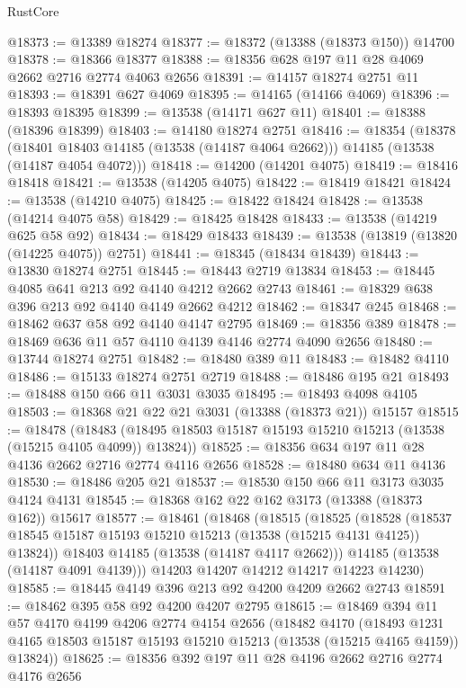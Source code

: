 \begin{lexlean}{RustCore}
\begin{coremodule}
@18373 := @13389 @18274
@18377 := @18372 (@13388 (@18373 @150)) @14700
@18378 := @18366 @18377
@18388 := @18356 @628 @197 @11 @28 @4069 @2662 @2716 @2774 @4063 @2656
@18391 := @14157 @18274 @2751 @11
@18393 := @18391 @627 @4069
@18395 := @14165 (@14166 @4069)
@18396 := @18393 @18395
@18399 := @13538 (@14171 @627 @11)
@18401 := @18388 (@18396 @18399)
@18403 := @14180 @18274 @2751
@18416 := @18354
    (@18378
      (@18401 @18403 @14185 (@13538 (@14187 @4064 @2662)))
      @14185
      (@13538 (@14187 @4054 @4072)))
@18418 := @14200 (@14201 @4075)
@18419 := @18416 @18418
@18421 := @13538 (@14205 @4075)
@18422 := @18419 @18421
@18424 := @13538 (@14210 @4075)
@18425 := @18422 @18424
@18428 := @13538 (@14214 @4075 @58)
@18429 := @18425 @18428
@18433 := @13538 (@14219 @625 @58 @92)
@18434 := @18429 @18433
@18439 := @13538 (@13819 (@13820 (@14225 @4075)) @2751)
@18441 := @18345 (@18434 @18439)
@18443 := @13830 @18274 @2751
@18445 := @18443 @2719 @13834
@18453 := @18445 @4085 @641 @213 @92 @4140 @4212 @2662 @2743
@18461 := @18329 @638 @396 @213 @92 @4140 @4149 @2662 @4212
@18462 := @18347 @245
@18468 := @18462 @637 @58 @92 @4140 @4147 @2795
@18469 := @18356 @389
@18478 := @18469 @636 @11 @57 @4110 @4139 @4146 @2774 @4090 @2656
@18480 := @13744 @18274 @2751
@18482 := @18480 @389 @11
@18483 := @18482 @4110
@18486 := @15133 @18274 @2751 @2719
@18488 := @18486 @195 @21
@18493 := @18488 @150 @66 @11 @3031 @3035
@18495 := @18493 @4098 @4105
@18503 := @18368 @21 @22 @21 @3031 (@13388 (@18373 @21)) @15157
@18515 := @18478
    (@18483 (@18495 @18503 @15187 @15193 @15210 @15213 (@13538 (@15215 @4105 @4099)) @13824))
@18525 := @18356 @634 @197 @11 @28 @4136 @2662 @2716 @2774 @4116 @2656
@18528 := @18480 @634 @11 @4136
@18530 := @18486 @205 @21
@18537 := @18530 @150 @66 @11 @3173 @3035 @4124 @4131
@18545 := @18368 @162 @22 @162 @3173 (@13388 (@18373 @162)) @15617
@18577 := @18461
    (@18468
      (@18515
        (@18525
          (@18528 (@18537 @18545 @15187 @15193 @15210 @15213 (@13538 (@15215 @4131 @4125)) @13824))
          @18403
          @14185
          (@13538 (@14187 @4117 @2662)))
        @14185
        (@13538 (@14187 @4091 @4139)))
      @14203
      @14207
      @14212
      @14217
      @14223
      @14230)
@18585 := @18445 @4149 @396 @213 @92 @4200 @4209 @2662 @2743
@18591 := @18462 @395 @58 @92 @4200 @4207 @2795
@18615 := @18469
    @394
    @11
    @57
    @4170
    @4199
    @4206
    @2774
    @4154
    @2656
    (@18482
      @4170
      (@18493 @1231 @4165 @18503 @15187 @15193 @15210 @15213 (@13538 (@15215 @4165 @4159)) @13824))
@18625 := @18356 @392 @197 @11 @28 @4196 @2662 @2716 @2774 @4176 @2656

\end{coremodule}
\end{lexlean}
